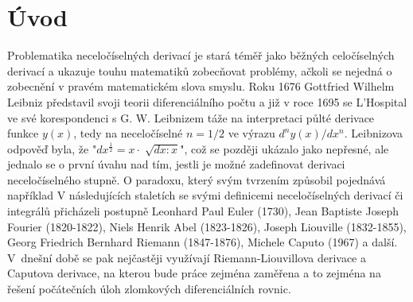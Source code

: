 \documentclass[a4paper,12pt,twoside]{article}
\theoremstyle{definition}
\theoremstyle{remark}
\numberwithin{equation}{section}
\numberwithin{table}{section}
\numberwithin{figure}{section}
\begin{document}
\newpage
\pagestyle{fancy}
\setlength{\headheight}{13.78807pt}
\renewcommand{\headrulewidth}{0.4pt}
\renewcommand{\sectionmark}[1]{\markboth{\thesection~  #1}{} }
\fancyhead[LO,RE]{\small\textit{\nouppercase{\leftmark}}}
\fancyhead[LE,RO]{\small\thepage}
\fancyfoot[LE,RO]{\empty}
\fancyfoot[CE,CO]{\empty}


\newpage
\tableofcontents
\newpage


\section{Úvod}

Problematika neceločíselných derivací je stará téměř jako běžných celočíselných derivací a ukazuje touhu matematiků zobecňovat problémy, ačkoli se nejedná o zobecnění v pravém matematickém slova smyslu. Roku 1676 Gottfried Wilhelm Leibniz představil svoji teorii diferenciálního počtu a již v roce 1695 se L'Hospital ve své korespondenci s G. W. Leibnizem táže na interpretaci půlté derivace funkce $y\left(x\right)$, tedy na neceločíselné $n = 1/2$ ve výrazu
$ {d^{n}y\left(x\right)}/{dx^{n}} $. Leibnizova odpověď byla, že "$dx^{\frac{1}{2}} = x \cdot \sqrt[]{dx :x}$", což se později ukázalo jako nepřesné, ale jednalo se o první úvahu nad tím, jestli je možné zadefinovat derivaci neceločíselného stupně. O paradoxu, který svým tvrzením způsobil pojednává například \cite{LeibnitzFail}
V následujících staletích se svými definicemi neceločíselných derivací či integrálů přicházeli postupně Leonhard Paul Euler (1730), Jean Baptiste Joseph Fourier (1820-1822), Niels Henrik Abel (1823-1826), Joseph Liouville (1832-1855), Georg Friedrich Bernhard Riemann  (1847-1876), Michele Caputo (1967)  a další. 
V~dnešní době se pak nejčastěji využívají Riemann-Liouvillova derivace a Caputova derivace, na kterou bude práce zejména zaměřena a to zejména na řešení počátečních úloh zlomkových diferenciálních rovnic. 
\end{document}
